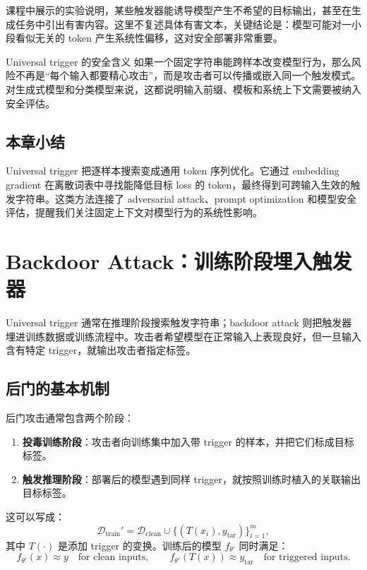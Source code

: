 \documentclass[a4paper]{article}
\begin{document}
课程中展示的实验说明，某些触发器能诱导模型产生不希望的目标输出，甚至在生成任务中引出有害内容。这里不复述具体有害文本，关键结论是：模型可能对一小段看似无关的 token 产生系统性偏移，这对安全部署非常重要。

\begin{warningbox}{Universal trigger 的安全含义}
    如果一个固定字符串能跨样本改变模型行为，那么风险不再是“每个输入都要精心攻击”，而是攻击者可以传播或嵌入同一个触发模式。对生成式模型和分类模型来说，这都说明输入前缀、模板和系统上下文需要被纳入安全评估。
\end{warningbox}

\subsection{本章小结}

Universal trigger 把逐样本搜索变成通用 token 序列优化。它通过 embedding gradient 在离散词表中寻找能降低目标 loss 的 token，最终得到可跨输入生效的触发字符串。这类方法连接了 adversarial attack、prompt optimization 和模型安全评估，提醒我们关注固定上下文对模型行为的系统性影响。

\section{Backdoor Attack：训练阶段埋入触发器}

Universal trigger 通常在推理阶段搜索触发字符串；backdoor attack 则把触发器埋进训练数据或训练流程中。攻击者希望模型在正常输入上表现良好，但一旦输入含有特定 trigger，就输出攻击者指定标签。

\subsection{后门的基本机制}

后门攻击通常包含两个阶段：

\begin{enumerate}
    \item \textbf{投毒训练阶段}：攻击者向训练集中加入带 trigger 的样本，并把它们标成目标标签。
    \item \textbf{触发推理阶段}：部署后的模型遇到同样 trigger，就按照训练时植入的关联输出目标标签。
\end{enumerate}

这可以写成：
\[
\mathcal{D}_{\mathrm{train}}'=
\mathcal{D}_{\mathrm{clean}}
\cup
\{(T(x_i),y_{\mathrm{tar}})\}_{i=1}^{m},
\]
其中 $T(\cdot)$ 是添加 trigger 的变换。训练后的模型 $f_{\theta'}$ 同时满足：
\[
f_{\theta'}(x)\approx y
\quad\text{for clean inputs},
\qquad
f_{\theta'}(T(x))\approx y_{\mathrm{tar}}
\quad\text{for triggered inputs}.
\]
\end{document}

